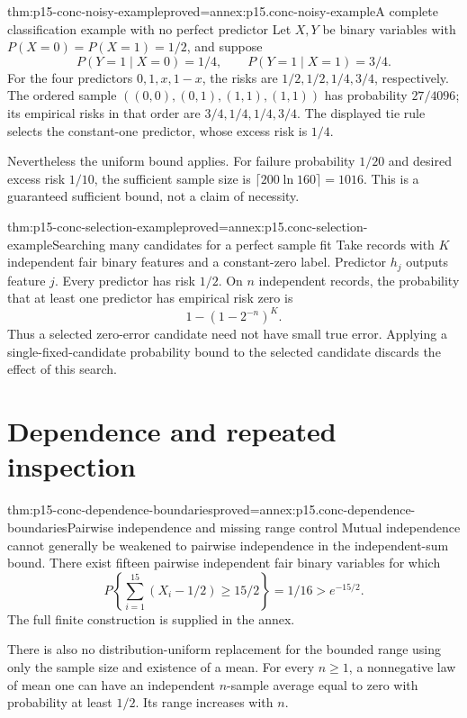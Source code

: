 \begin{hbtheorem}{thm:p15-conc-noisy-example}{proved=annex:p15.conc-noisy-example}{A complete classification example with no perfect predictor}
Let \(X,Y\) be binary variables with \(P(X=0)=P(X=1)=1/2\), and suppose
\[
       P(Y=1\mid X=0)=1/4,\qquad P(Y=1\mid X=1)=3/4.
\]
For the four predictors \(0,1,x,1-x\), the risks are
\(1/2,1/2,1/4,3/4\), respectively.
The ordered sample
\(((0,0),(0,1),(1,1),(1,1))\) has probability \(27/4096\);
its empirical risks in that order are \(3/4,1/4,1/4,3/4\).
The displayed tie rule selects the constant-one predictor,
whose excess risk is \(1/4\).

Nevertheless the uniform bound applies. For failure probability
\(1/20\) and desired excess risk \(1/10\), the sufficient sample
size is \(\lceil200\ln160\rceil=1016\).
This is a guaranteed sufficient bound, not a claim of necessity.
\end{hbtheorem}

\begin{hbtheorem}{thm:p15-conc-selection-example}{proved=annex:p15.conc-selection-example}{Searching many candidates for a perfect sample fit}
Take records with \(K\) independent fair binary features and a
constant-zero label. Predictor \(h_j\) outputs feature \(j\).
Every predictor has risk \(1/2\). On \(n\) independent records,
the probability that at least one predictor has empirical risk zero is
\[
                          1-(1-2^{-n})^K.
\]
Thus a selected zero-error candidate need not have small true error.
Applying a single-fixed-candidate probability bound to the selected
candidate discards the effect of this search.
\end{hbtheorem}

\section{Dependence and repeated inspection}

\begin{hbtheorem}{thm:p15-conc-dependence-boundaries}{proved=annex:p15.conc-dependence-boundaries}{Pairwise independence and missing range control}
Mutual independence cannot generally be weakened to pairwise independence
in the independent-sum bound. There exist fifteen pairwise independent
fair binary variables for which
\[
        P\!\left\{\sum_{i=1}^{15}(X_i-1/2)\geq15/2\right\}
                         =1/16>e^{-15/2}.
\]
The full finite construction is supplied in the annex.

There is also no distribution-uniform replacement for the bounded
range using only the sample size and existence of a mean.
For every \(n\geq1\), a nonnegative law of mean one can have
an independent \(n\)-sample average equal to zero with probability
at least \(1/2\). Its range increases with \(n\).
\end{hbtheorem}

